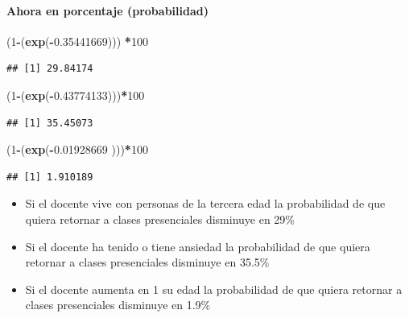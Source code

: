 \documentclass[
]{article}
\newenvironment{Shaded}{\begin{snugshade}}{\end{snugshade}}
\newcommand{\DecValTok}[1]{\textcolor[rgb]{0.00,0.00,0.81}{#1}}
\newcommand{\FloatTok}[1]{\textcolor[rgb]{0.00,0.00,0.81}{#1}}
\newcommand{\FunctionTok}[1]{\textcolor[rgb]{0.13,0.29,0.53}{\textbf{#1}}}
\newcommand{\NormalTok}[1]{#1}
\newcommand{\SpecialCharTok}[1]{\textcolor[rgb]{0.81,0.36,0.00}{\textbf{#1}}}
\begin{document}
\hypertarget{ahora-en-porcentaje-probabilidad}{%
\paragraph{Ahora en porcentaje
(probabilidad)}\label{ahora-en-porcentaje-probabilidad}}

\begin{Shaded}
\begin{Highlighting}[]
\NormalTok{(}\DecValTok{1}\SpecialCharTok{{-}}\NormalTok{(}\FunctionTok{exp}\NormalTok{(}\SpecialCharTok{{-}}\FloatTok{0.35441669}\NormalTok{))) }\SpecialCharTok{*}\DecValTok{100}
\end{Highlighting}
\end{Shaded}

\begin{verbatim}
## [1] 29.84174
\end{verbatim}

\begin{Shaded}
\begin{Highlighting}[]
\NormalTok{(}\DecValTok{1}\SpecialCharTok{{-}}\NormalTok{(}\FunctionTok{exp}\NormalTok{(}\SpecialCharTok{{-}}\FloatTok{0.43774133}\NormalTok{)))}\SpecialCharTok{*}\DecValTok{100} 
\end{Highlighting}
\end{Shaded}

\begin{verbatim}
## [1] 35.45073
\end{verbatim}

\begin{Shaded}
\begin{Highlighting}[]
\NormalTok{(}\DecValTok{1}\SpecialCharTok{{-}}\NormalTok{(}\FunctionTok{exp}\NormalTok{(}\SpecialCharTok{{-}}\FloatTok{0.01928669}\NormalTok{ )))}\SpecialCharTok{*}\DecValTok{100} 
\end{Highlighting}
\end{Shaded}

\begin{verbatim}
## [1] 1.910189
\end{verbatim}

\begin{itemize}
\item
  Si el docente vive con personas de la tercera edad la probabilidad de
  que quiera retornar a clases presenciales disminuye en 29\%
\item
  Si el docente ha tenido o tiene ansiedad la probabilidad de que quiera
  retornar a clases presenciales disminuye en 35.5\%
\item
  Si el docente aumenta en 1 su edad la probabilidad de que quiera
  retornar a clases presenciales disminuye en 1.9\%
\end{itemize}
\end{document}
